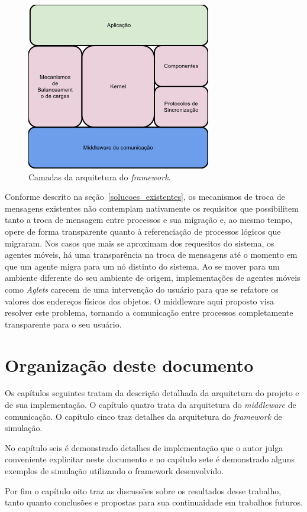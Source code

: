 \begin{figure}
  \centerline{\includegraphics{arquitetura_macro.png}}
  \caption{Camadas da arquitetura do \textit{framework}.}
\label{fig:arquitetura_macro}
\end{figure}

Conforme descrito na seção~\ref{solucoes_existentes}, os mecanismos de troca de mensagens existentes não contemplam nativamente os requisitos que possibilitem tanto a troca de mensagem entre processos e sua migração e, ao mesmo tempo, opere de forma transparente quanto à referenciação de processos lógicos que migraram. Nos casos que mais se aproximam dos requesitos do sistema, os agentes móveis, há uma transparência na troca de mensagens até o momento em que um agente migra para um nó distinto do sistema. Ao se mover para um ambiente diferente do seu ambiente de origem, implementações de agentes móveis como \textit{Aglets} carecem de uma intervenção do usuário para que se refatore os valores dos endereços físicos dos objetos. O middleware aqui proposto visa resolver este problema, tornando a comunicação entre processos completamente transparente para o seu usuário.

\section{Organização deste documento}

Os capítulos seguintes tratam da descrição detalhada da arquitetura do projeto e de sua implementação. O capítulo quatro trata da arquitetura do \textit{middleware} de comunicação. O capítulo cinco traz detalhes da arquitetura do \textit{framework} de simulação.

No capítulo seis é demonstrado detalhes de implementação que o autor julga conveniente explicitar neste documento e no capítulo sete é demonstrado alguns exemplos de simulação utilizando o framework desenvolvido.

Por fim o capítulo oito traz as discussões sobre os resultados desse trabalho, tanto quanto conclusões e propostas para sua continuaidade em trabalhos futuros.


